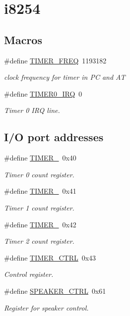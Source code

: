 \hypertarget{group__i8254}{}\section{i8254}
\label{group__i8254}
\subsection*{Macros}
\begin{DoxyCompactItemize}
\item 
\#define \hyperlink{group__i8254_gacf926951944b6cf370b7229ebd50dd8b}{T\+I\+M\+E\+R\+\_\+\+F\+R\+EQ}~1193182
\begin{DoxyCompactList}\small\item\em clock frequency for timer in PC and AT \end{DoxyCompactList}\item 
\#define \hyperlink{group__i8254_ga30bf84c312af248cb81bb224e09f9ba8}{T\+I\+M\+E\+R0\+\_\+\+I\+RQ}~0
\begin{DoxyCompactList}\small\item\em Timer 0 I\+RQ line. \end{DoxyCompactList}\end{DoxyCompactItemize}
\subsection*{I/O port addresses}
\begin{DoxyCompactItemize}
\item 
\#define \hyperlink{group__i8254_gacc9ff9df4a9674a1ce9ba08fc4a4679e}{T\+I\+M\+E\+R\+\_}~0x40
\begin{DoxyCompactList}\small\item\em Timer 0 count register. \end{DoxyCompactList}\item 
\#define \hyperlink{group__i8254_gac62c99c2a9289891c1b83052242cca49}{T\+I\+M\+E\+R\+\_}~0x41
\begin{DoxyCompactList}\small\item\em Timer 1 count register. \end{DoxyCompactList}\item 
\#define \hyperlink{group__i8254_ga1f34f18ad0ab8cace46b615773b48735}{T\+I\+M\+E\+R\+\_}~0x42
\begin{DoxyCompactList}\small\item\em Timer 2 count register. \end{DoxyCompactList}\item 
\#define \hyperlink{group__i8254_ga282832448fb0281ef53d243c1cd48491}{T\+I\+M\+E\+R\+\_\+\+C\+T\+RL}~0x43
\begin{DoxyCompactList}\small\item\em Control register. \end{DoxyCompactList}\item 
\#define \hyperlink{group__i8254_ga51b3a5e3d4811ca063fe25e35560ab40}{S\+P\+E\+A\+K\+E\+R\+\_\+\+C\+T\+RL}~0x61
\begin{DoxyCompactList}\small\item\em Register for speaker control. \end{DoxyCompactList}\end{DoxyCompactItemize}
